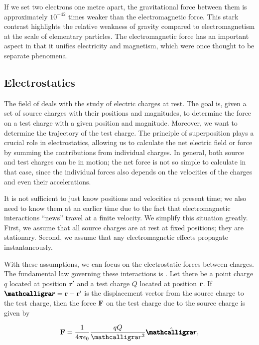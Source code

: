 If we set two electrons one metre apart, the gravitational force between them is approximately $10^{-42}$ times weaker than the electromagnetic force. This stark contrast highlights the relative weakness of gravity compared to electromagnetism at the scale of elementary particles. The electromagnetic force has an important aspect in that it unifies electricity and magnetism, which were once thought to be separate phenomena.


\subsection{Electrostatics}

The field of  deals with the study of electric charges at rest. The goal is, given a set of source charges with their positions and magnitudes, to determine the force on a test charge with a given position and magnitude. Moreover, we want to determine the trajectory of the test charge. The principle of superposition plays a crucial role in electrostatics, allowing us to calculate the net electric field or force by summing the contributions from individual charges. In general, both source and test charges can be in motion; the net force is not so simple to calculate in that case, since the individual forces also depends on the velocities of the charges and even their accelerations.

It is not sufficient to just know positions and velocities at present time; we also need to know them at an earlier time due to the fact that electromagnetic interactions ``news'' travel at a finite velocity. We simplify this situation greatly. First, we assume that all source charges are at rest at fixed positions; they are stationary. Second, we assume that any electromagnetic effects propagate instantaneously.

With these assumptions, we can focus on the electrostatic forces between charges. The fundamental law governing these interactions is . Let there be a point charge $q$ located at position $\mathbf{r}'$ and a test charge $Q$ located at position $\mathbf{r}$. If $\bcurs{r} = \bv{r} - \bv{r}'$ is the displacement vector from the source charge to the test charge, then the force $\mathbf{F}$ on the test charge due to the source charge is given by

\begin{align}
    \bv{F} = \frac{1}{4 \pi \epsilon_{0}} \frac{q Q}{\curs{r}^{2}} \hat{\bcurs{r}},
\end{align}

